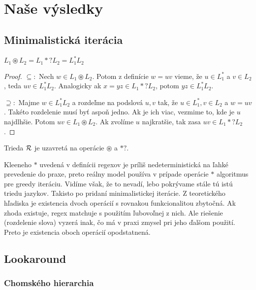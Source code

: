 \chapter{Naše výsledky}
\label{chap:vysledky}

\section{Minimalistická iterácia}
\label{iteracia}

\begin{veta}
$L_1 \circledast L_2 = L_1 *? L_2 = L_1^*L_2$
\end{veta}
\begin{proof}
$\subseteq:$
Nech $w \in L_1 \circledast L_2$. Potom z definície $w=uv$ vieme, že $u \in L_1^*$ a $v \in L_2$, teda $uv \in L_1^*L_2$. Analogicky ak $x=yz \in L_1 *? L_2$, potom $yz \in L_1^*L_2$.

$\supseteq:$
Majme $w \in L_1^*L_2$ a rozdeľme na podslová $u,v$ tak, že $u \in L_1^*, v \in L_2$ a $w=uv$. Takéto rozdelenie musí byť aspoň jedno. Ak je ich viac, vezmime to, kde je $u$ najdlhšie. Potom $uv \in L_1 \circledast L_2$. Ak zvolíme $u$ najkratšie, tak zasa $uv \in L_1 *? L_2$.
\end{proof}

\begin{dosledok}
Trieda ${\cal R}$ je uzavretá na operácie $\circledast$ a $*?$.
\end{dosledok}

Kleeneho $*$ uvedená v definícii regexov je príliš nedeterministická na ľahké prevedenie do praxe, preto reálny model používa v prípade operácie $*$ algoritmus pre greedy iteráciu. Vidíme však, že to nevadí, lebo pokrývame stále tú istú triedu jazykov. Takisto po pridaní minimalistickej iterácie. Z teoretického hľadiska je existencia dvoch operácií s rovnakou funkcionalitou  zbytočná. Ak zhoda existuje, regex matchuje s použitím ľubovoľnej z nich. Ale riešenie (rozdelenie slova) vyzerá inak, čo má v praxi zmysel pri jeho ďalšom použití. Preto je existencia oboch operácií opodstatnená.

\section{Lookaround}
\label{chap:lookahead}

\subsection{Chomského hierarchia}

